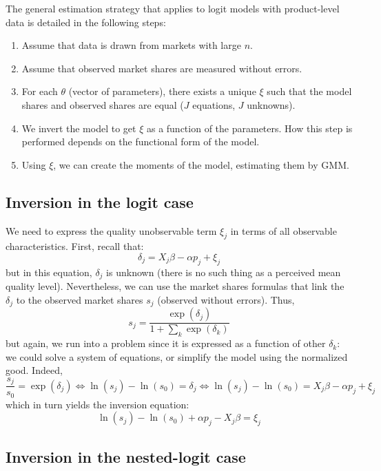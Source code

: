 \documentclass[12pt]{report}
\begin{document}
The general estimation strategy that applies to logit models with product-level data is detailed in the following steps:\begin{enumerate}
\item Assume that data is drawn from markets with large $n$.
\item Assume that observed market shares are measured without errors.
\item For each $\theta$ (vector of parameters), there exists a unique $\xi$ such that the model shares and observed shares are equal ($J$ equations, $J$ unknowns).
\item We invert the model to get $\xi$ as a function of the parameters. How this step is performed depends on the functional form of the model.
\item Using $\xi$, we can create the moments of the model, estimating them by GMM. 
\end{enumerate}

\subsection{Inversion in the logit case}

We need to express the quality unobservable term $\xi_j$ in terms of all observable characteristics. First, recall that: $$ \delta_j = X_j\beta - \alpha p_j + \xi_j $$ but in this equation, $\delta_j$ is unknown (there is no such thing as a perceived mean quality level). Nevertheless, we can use the market shares formulas that link the $\delta_j$ to the observed market shares $s_j$ (observed without errors). Thus, $$s_j = \frac{\exp(\delta_j)}{1 + \sum_k \exp(\delta_k) } $$ but again, we run into a problem since it is expressed as a function of other $\delta_k$: we could solve a system of equations, or simplify the model using the normalized good. Indeed, $$\frac{s_j}{s_0} = \exp(\delta_j) \Leftrightarrow \ln(s_j) - \ln(s_0) = \delta_j \Leftrightarrow \ln(s_j) - \ln(s_0) = X_j\beta - \alpha p_j + \xi_j $$ which in turn yields the inversion equation: $$
\ln(s_j) - \ln(s_0) +  \alpha p_j  - X_j\beta = \xi_j $$

\subsection{Inversion in the nested-logit case}
\end{document}
